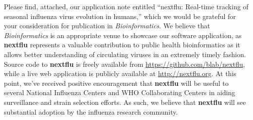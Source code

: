 \documentclass[stdletter,letterpaper,addrfromleft,orderfromdateto,dateleft,11pt,noaddrto,sigleft]{newlfm}
\newcommand{\nextflu}{\textbf{nextflu}}
\begin{document}
\begin{newlfm}

Please find, attached, our application note entitled ``nextflu: Real-time tracking of seasonal influenza virus evolution in humans,'' which we would be grateful for your consideration for publication in \textit{Bioinformatics}.
We believe that \textit{Bioinformatics} is an appropriate venue to showcase our software application, as \nextflu{} represents a valuable contribution to public health bioinformatics as it allows better understanding of circulating viruses in an extremely timely fashion.
Source code to \nextflu{} is freely available from \url{https://github.com/blab/nextflu}, while a live web application is publicly available at \url{http://nextflu.org}.
At this point, we've received positive encouragement that \nextflu{} will be useful to several National Influenza Centers and WHO Collaborating Centers in aiding surveillance and strain selection efforts.
As such, we believe that \nextflu{} will see substantial adoption by the influenza research community.

\end{newlfm}
\end{document}
